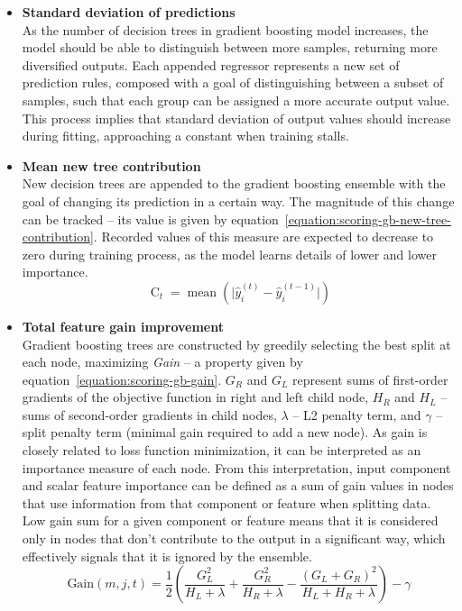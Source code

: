 \documentclass[a4paper,11pt,twoside]{report}
\theoremstyle{definition}
\begin{document}
\begin{itemize}
    \item \textbf{Standard deviation of predictions} \\
    As the number of decision trees in gradient boosting model increases, the model should be able to distinguish between more samples, returning more diversified outputs. Each appended regressor represents a new set of prediction rules, composed with a goal of distinguishing between a subset of samples, such that each group can be assigned a more accurate output value. This process implies that standard deviation of output values should increase during fitting, approaching a constant when training stalls.
    \item \textbf{Mean new tree contribution} \\
    New decision trees are appended to the gradient boosting ensemble with the goal of changing its prediction in a certain way. The magnitude of this change can be tracked -- its value is given by equation~\ref{equation:scoring-gb-new-tree-contribution}. Recorded values of this measure are expected to decrease to zero during training process, as the model learns details of lower and lower importance. 
    \begin{equation}
    \label{equation:scoring-gb-new-tree-contribution}
        \operatorname{C}_t = \operatorname{mean}(\vert \hat{y}_i^{(t)} - \hat{y}_i^{(t-1)} \vert)
    \end{equation}
    \item \textbf{Total feature gain improvement} \\
    Gradient boosting trees are constructed by greedily selecting the best split at each node, maximizing \textit{Gain} -- a property given by equation~\ref{equation:scoring-gb-gain}. $G_R$ and $G_L$ represent sums of first-order gradients of the objective function in right and left child node, $H_R$ and $H_L$ -- sums of second-order gradients in child nodes, $\lambda$ -- L2 penalty term, and $\gamma$ -- split penalty term (minimal gain required to add a new node). As gain is closely related to loss function minimization, it can be interpreted as an importance measure of each node. From this interpretation, input component and scalar feature importance can be defined as a sum of gain values in nodes that use information from that component or feature when splitting data. Low gain sum for a given component or feature means that it is considered only in nodes that don't contribute to the output in a significant way, which effectively signals that it is ignored by the ensemble.
    \begin{equation}
    \label{equation:scoring-gb-gain}
        \text{Gain}(m, j, t) = \frac{1}{2}\left( \frac{G_L^2}{H_L + \lambda} + \frac{G_R^2}{H_R + \lambda} - \frac{(G_L + G_R)^2}{H_L + H_R + \lambda} \right) - \gamma
    \end{equation}
\end{itemize}
\end{document}
